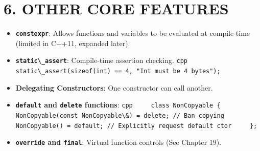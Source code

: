 \hypertarget{other-core-features}{%
\section{6. OTHER CORE FEATURES}\label{other-core-features}}

\begin{itemize}
\tightlist
\item
  \textbf{\passthrough{\lstinline!constexpr!}}: Allows functions and
  variables to be evaluated at compile-time (limited in C++11, expanded
  later).
\item
  \textbf{\passthrough{\lstinline!static\_assert!}}: Compile-time
  assertion checking.
  \passthrough{\lstinline!cpp     static\_assert(sizeof(int) == 4, "Int must be 4 bytes");!}
\item
  \textbf{Delegating Constructors}: One constructor can call another.
\item
  \textbf{\passthrough{\lstinline!default!} and
  \passthrough{\lstinline!delete!} functions}:
  \passthrough{\lstinline!cpp     class NonCopyable \{         NonCopyable(const NonCopyable\&) = delete; // Ban copying         NonCopyable() = default; // Explicitly request default ctor     \};!}
\item
  \textbf{\passthrough{\lstinline!override!} and
  \passthrough{\lstinline!final!}}: Virtual function controls (See
  Chapter 19).
\end{itemize}
